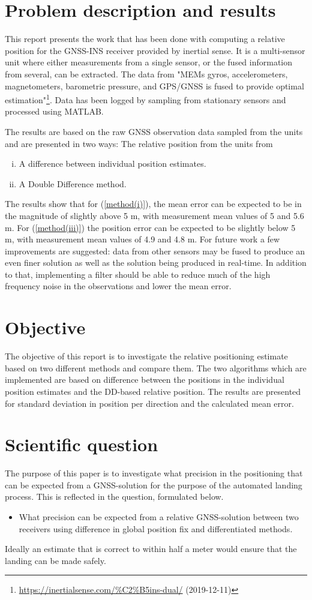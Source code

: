 \section{Problem description and results}
This report presents the work that has been done with computing a relative position for the GNSS-INS receiver provided by inertial sense. It is a multi-sensor unit where either measurements from a single sensor, or the fused information from several, can be extracted. The data from "MEMs gyros, accelerometers, magnetometers, barometric pressure, and GPS/GNSS is fused to provide optimal estimation"\footnote{\url{https://inertialsense.com/\%C2\%B5ins-dual/} (2019-12-11)}. Data has been logged by sampling from stationary sensors and processed using MATLAB. 
\par
The results are based on the raw GNSS observation data sampled from the units and are presented in two ways: The relative position from the units from
\begin{enumerate}[(i)]
\item A difference between individual position estimates. \label{method(i)}
\item A Double Difference method. \label{method(iii)}
\end{enumerate}
The results show that for (\ref{method(i)}), the mean error can be expected to be in the magnitude of slightly above 5 m, with measurement mean values of 5 and 5.6 m. For (\ref{method(iii)}) the position error can be expected to be slightly below 5 m, with measurement mean values of 4.9 and 4.8 m. For future work a few improvements are suggested: data from other sensors may be fused to produce an even finer solution as well as the solution being produced in real-time. In addition to that, implementing a filter should be able to reduce much of the high frequency noise in the observations and lower the mean error.
\section{Objective} \label{sectionObjective}
The objective of this report is to investigate the relative positioning estimate based on two different methods and compare them. The two algorithms which are implemented are based on difference between the positions in the individual position estimates and the DD-based relative position. The results are presented for standard deviation in position per direction and the calculated mean error.
\section{Scientific question}
The purpose of this paper is to investigate what precision in the positioning that can be expected from a GNSS-solution for the purpose of the automated landing process. This is reflected in the question, formulated below.
\begin{itemize}
\item What precision can be expected from a relative GNSS-solution between two receivers using difference in global position fix and differentiated methods.
\end{itemize}
Ideally an estimate that is correct to within half a meter would ensure that the landing can be made safely.

